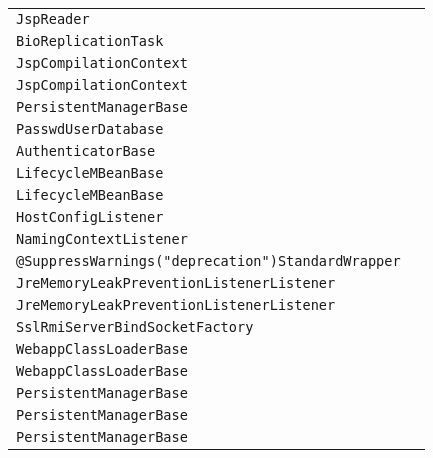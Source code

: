 \begin{center}
\begin{tabular}{ll}
\lstinline/JspReader/&\raisebox{0pt}{\lstinline/ JspReader(JspCompilationContext)/}\\ 
\lstinline/BioReplicationTask/&\raisebox{0pt}{\lstinline/ sendAck(byte[])/}\\ 
\lstinline/JspCompilationContext/&\raisebox{0pt}{\lstinline/ CompilercreateCompiler(String)/}\\ 
\lstinline/JspCompilationContext/&\raisebox{0pt}{\lstinline/ CompilercreateCompiler(String)/}\\ 
\lstinline/PersistentManagerBase/&\raisebox{0pt}{\lstinline/ startInternal())/}\\ 
\lstinline/PasswdUserDatabase/&\raisebox{0pt}{\lstinline/ init()/}\\ 
\lstinline/AuthenticatorBase/&\raisebox{0pt}{\lstinline/ JaspicStategetJaspicState(AuthConfigProvider)/}\\ 
\lstinline/LifecycleMBeanBase/&\raisebox{0pt}{\lstinline/ unregister(ObjectNameon)/}\\ 
\lstinline/LifecycleMBeanBase/&\raisebox{0pt}{\lstinline/ unregister(ObjectNameon)/}\\ 
\lstinline/HostConfigListener/&\raisebox{0pt}{\lstinline/ checkUndeploy()/}\\ 
\lstinline/NamingContextListener/&\raisebox{0pt}{\lstinline/ removeResourceLink(String)/}\\ 
\lstinline/@SuppressWarnings("deprecation")StandardWrapper/&\raisebox{0pt}{\lstinline/ unload()/}\\ 
\lstinline/JreMemoryLeakPreventionListenerListener/&\raisebox{0pt}{\lstinline/ lifecycleEvent(LifecycleEvent)/}\\ 
\lstinline/JreMemoryLeakPreventionListenerListener/&\raisebox{0pt}{\lstinline/ lifecycleEvent(LifecycleEvent)/}\\ 
\lstinline/SslRmiServerBindSocketFactory/&\raisebox{0pt}{\lstinline/ SslRmiServerBindSocketFactory(String[])/}\\ 
\lstinline/WebappClassLoaderBase/&\raisebox{0pt}{\lstinline/ findClassInternal(String)/}\\ 
\lstinline/WebappClassLoaderBase/&\raisebox{0pt}{\lstinline/ findClassInternal(String)/}\\ 
\lstinline/PersistentManagerBase/&\raisebox{0pt}{\lstinline/ startInternal())/}\\ 
\lstinline/PersistentManagerBase/&\raisebox{0pt}{\lstinline/ startInternal())/}\\ 
\lstinline/PersistentManagerBase/&\raisebox{0pt}{\lstinline/ startInternal())/}\\ 

\end{tabular}
\end{center}
